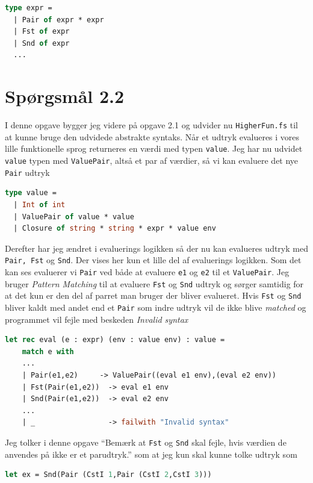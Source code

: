 \documentclass[danish,a4paper]{report}
\begin{document}
\begin{lstlisting}[language=ML]
type expr = 
  | Pair of expr * expr
  | Fst of expr 
  | Snd of expr 
  ...
\end{lstlisting}

\section*{Spørgsmål 2.2}

I denne opgave bygger jeg videre på opgave 2.1 og udvider nu \texttt{HigherFun.fs} til at kunne bruge den udvidede abstrakte syntaks. Når et udtryk evalueres i vores lille funktionelle sprog returneres en værdi med typen \texttt{value}. Jeg har nu udvidet \texttt{value} typen med \texttt{ValuePair}, altså et par af værdier, så vi kan evaluere det nye \texttt{Pair} udtryk

\begin{lstlisting}[language=ML]
type value = 
  | Int of int
  | ValuePair of value * value
  | Closure of string * string * expr * value env
\end{lstlisting}

Derefter har jeg ændret i evaluerings logikken så der nu kan evalueres udtryk med \texttt{Pair, Fst} og \texttt{Snd}. Der vises her kun et lille del af evaluerings logikken. Som det kan ses evaluerer vi \texttt{Pair} ved både at evaluere \texttt{e1} og \texttt{e2} til et \texttt{ValuePair}. Jeg bruger \textit{Pattern Matching} til at evaluere \texttt{Fst} og \texttt{Snd} udtryk og sørger samtidig for at det kun er den del af parret man bruger der bliver evalueret. Hvis \texttt{Fst} og \texttt{Snd} bliver kaldt med andet end et \texttt{Pair} som indre udtryk vil de ikke blive \textit{matched} og programmet vil fejle med beskeden \textit{Invalid syntax}


\begin{lstlisting}[language=ML]
let rec eval (e : expr) (env : value env) : value =
    match e with
    ...
    | Pair(e1,e2)     -> ValuePair((eval e1 env),(eval e2 env)) 
    | Fst(Pair(e1,e2))  -> eval e1 env
    | Snd(Pair(e1,e2))  -> eval e2 env
    ...
    | _                 -> failwith "Invalid syntax"
\end{lstlisting}

Jeg tolker i denne opgave ``Bemærk at \texttt{Fst} og \texttt{Snd} skal fejle, hvis værdien de anvendes på ikke er et parudtryk.'' som at jeg kun skal kunne tolke udtryk som

\begin{lstlisting}[language=ML]
let ex = Snd(Pair (CstI 1,Pair (CstI 2,CstI 3)))
\end{lstlisting}
\end{document}
